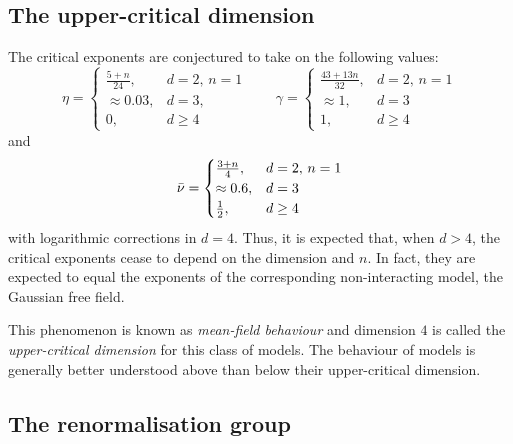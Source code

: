 

\subsection{The upper-critical dimension}

The critical exponents are conjectured to take on the following values:
\begin{equation}
\eta =
	\begin{cases}
	\frac{5 + n}{24},		& d = 2, \, n = 1 \\
	\approx 0.03,			& d = 3, \\
	0,						& d \ge 4
	\end{cases}
\qquad
\gamma =
	\begin{cases}
	\frac{43 + 13 n}{32},	& d = 2, \, n = 1 \\
	\approx 1,				& d = 3 \\
	1,						& d \ge 4
	\end{cases}
\end{equation}
and
\begin{equation}
\bar\nu =
	\begin{cases}
	\frac{3 + n}{4},		& d = 2, \, n = 1 \\
	\approx 0.6,			& d = 3 \\
	\frac{1}{2},			& d \ge 4
	\end{cases}
\end{equation}
with logarithmic corrections in $d = 4$.
Thus, it is expected that, when $d > 4$, the critical exponents cease to depend
on the dimension and $n$. In fact, they are expected to equal the exponents of
the corresponding non-interacting model, the Gaussian free field.

This phenomenon is known as \emph{mean-field behaviour} and dimension $4$ is
called the \emph{upper-critical dimension} for this class of models. The behaviour
of models is generally better understood above than below their upper-critical
dimension.


\subsection{The renormalisation group}


